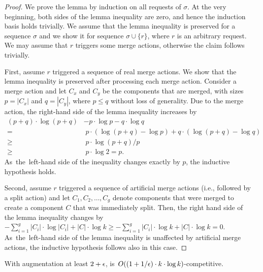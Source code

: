 \begin{proof}
We prove the lemma by induction on all requests of $\sigma$. At the very
beginning, both sides of the lemma inequality are zero, and hence the induction
basis holds trivially. We assume that the lemma inequality is preserved for a
sequence $\sigma$ and we show it for sequence $\sigma \cup \{ r \}$, where $r$
is an arbitrary request. We may assume that $r$ triggers some merge actions,
otherwise the claim follows trivially.

First, assume $r$ triggered a sequence of real merge actions. We show that the
lemma inequality is preserved after processing each merge action. Consider a
merge action and let $C_x$ and $C_y$ be the components that are merged, with
sizes $p = |C_x|$ and $q = |C_y|$, where $p \leq q$ without loss of generality.
Due to the merge action, the right-hand side of the lemma inequality increases
by
\begin{align*}
  (p + q) \cdot \log (p + q) & - p \cdot \log p - q \cdot \log q \\
		= &\; p \cdot (\log (p+q) - \log p) + q \cdot (\log (p+q) - \log q) \\
		\geq &\; p \cdot \log (p+q) / p \\
		\geq &\; p \cdot \log 2 = p.
\end{align*}
As~the~left-hand side of the inequality changes exactly by $p$, the inductive
hypothesis holds.

Second, assume $r$ triggered a sequence of artificial merge actions (i.e., followed by a
split action) and let $C_1, C_2, \ldots, C_g$ denote components that were
merged to create a component $C$ that was immediately split. Then, the right
hand side of the lemma inequality changes by $- \sum_{i = 1}^g |C_i| \cdot
\log |C_i| + |C| \cdot \log k
\geq - \sum_{i = 1}^g |C_i| \cdot \log k + |C| \cdot \log k = 0$.
As~the~left-hand side of the lemma inequality is unaffected by artificial
merge actions, the inductive hypothesis follows also in this case.
\end{proof}


\begin{theorem}
With augmentation at least $2+\epsilon$, \CREP is~$O((1 + 1/\epsilon) \cdot k \cdot \log k)$-competitive.
\end{theorem}

